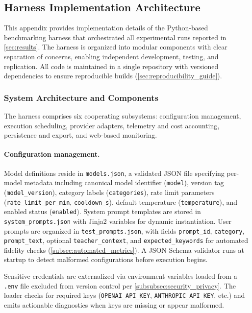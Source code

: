 \subsection{Harness Implementation Architecture}
\label{app:harness_architecture}
\label{app:harness_implementation}  %

This appendix provides implementation details of the Python-based benchmarking harness that orchestrated all experimental runs reported in \cref{sec:results}. The harness is organized into modular components with clear separation of concerns, enabling independent development, testing, and replication. All code is maintained in a single repository with versioned dependencies to ensure reproducible builds (\cref{sec:reproducibility_guide}).

\subsubsection{System Architecture and Components}

The harness comprises six cooperating subsystems: configuration management, execution scheduling, provider adapters, telemetry and cost accounting, persistence and export, and web-based monitoring.

\paragraph{Configuration management.} Model definitions reside in \texttt{models.json}, a validated JSON file specifying per-model metadata including canonical model identifier (\texttt{model}), version tag (\texttt{model\_version}), category labels (\texttt{categories}), rate limit parameters (\texttt{rate\_limit\_per\_min}, \texttt{cooldown\_s}), default temperature (\texttt{temperature}), and enabled status (\texttt{enabled}). System prompt templates are stored in \texttt{system\_prompts.json} with Jinja2 variables for dynamic instantiation. User prompts are organized in \texttt{test\_prompts.json}, with fields \texttt{prompt\_id}, \texttt{category}, \texttt{prompt\_text}, optional \texttt{teacher\_context}, and \texttt{expected\_keywords} for automated fidelity checks (\cref{subsec:automated_metrics}). A JSON Schema validator runs at startup to detect malformed configurations before execution begins.

Sensitive credentials are externalized via environment variables loaded from a \texttt{.env} file excluded from version control per \cref{subsubsec:security_privacy}. The loader checks for required keys (\texttt{OPENAI\_API\_KEY}, \texttt{ANTHROPIC\_API\_KEY}, etc.) and emits actionable diagnostics when keys are missing or appear malformed.

